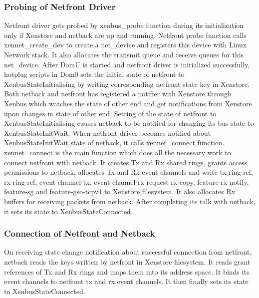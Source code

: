 \subsubsection{Probing of Netfront Driver}
Netfront driver gets probed by xenbus\_probe function during its initialization only if Xenstore and netback are up and running. Netfront probe function calls xennet\_create\_dev to create a net\_device and registers this device with Linux Network stack. It also allocates the transmit queue and receive queues for this net\_device. After DomU is started and netfront driver is initialized successfully, hotplug scripts in Dom0 sets the initial state of netfront to XenbusStateInitialising by writing corresponding netfront state key in Xenstore. Both netback and netfront has registered a notifier with Xenstore through Xenbus which watches the state of other end and get notifications from Xenstore upon changes in state of other end. Setting of the state of netfront to XenbusStateInitialising causes netback to be notified for changing its bus state to XenbusStateInitWait. When netfront driver becomes notified about XenbusStateInitWait state of netback, it calls xennet\_connect function. xennet\_connect is the main function which does all the necessary work to connect netfront with netback. It  creates Tx and Rx shared rings, grants access permissions to netback, allocates Tx and Rx event channels and write tx-ring-ref, rx-ring-ref, event-channel-tx, event-channel-rx request-rx-copy, feature-rx-notify, feature-sg and feature-gso-tcpv4 to Xenstore filesystem. It also allocates Rx buffers for receiving packets from netback. After completing its talk with netback, it sets its state to XenbusStateConnected. 
\subsubsection{Connection of Netfront and Netback}
On receiving state change notification about successful connection from netfront, netback reads the keys written by netfront in Xenstore filesystem. It reads grant references of Tx and Rx rings and maps them into its address space. It binds its event channels to netfront tx and rx event channels. It then finally sets its state to XenbusStateConnected.


